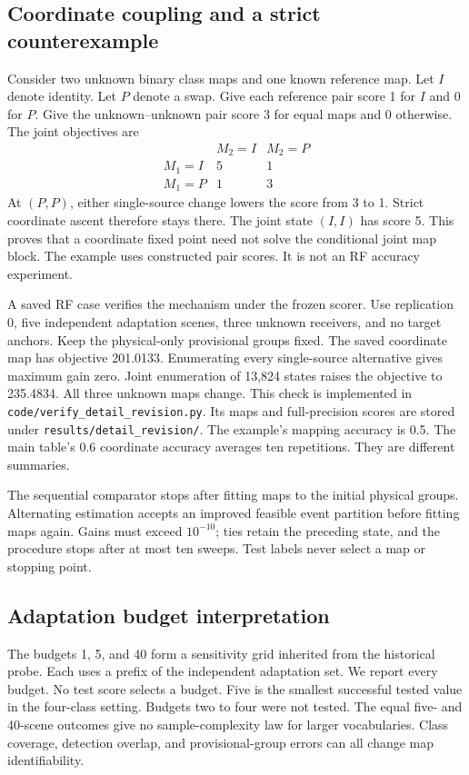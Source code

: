 \documentclass[10pt,a4paper]{article}
\begin{document}
\subsection{Coordinate coupling and a strict counterexample}
Consider two unknown binary class maps and one known reference map. Let $I$ denote identity. Let $P$ denote a swap. Give each reference pair score 1 for $I$ and 0 for $P$. Give the unknown--unknown pair score 3 for equal maps and 0 otherwise. The joint objectives are
\[
\begin{array}{c|cc}
 & M_2=I & M_2=P\\\hline
 M_1=I & 5 & 1\\
 M_1=P & 1 & 3
\end{array}
\]
At $(P,P)$, either single-source change lowers the score from 3 to 1. Strict coordinate ascent therefore stays there. The joint state $(I,I)$ has score 5. This proves that a coordinate fixed point need not solve the conditional joint map block. The example uses constructed pair scores. It is not an RF accuracy experiment.

A saved RF case verifies the mechanism under the frozen scorer. Use replication 0, five independent adaptation scenes, three unknown receivers, and no target anchors. Keep the physical-only provisional groups fixed. The saved coordinate map has objective 201.0133. Enumerating every single-source alternative gives maximum gain zero. Joint enumeration of 13,824 states raises the objective to 235.4834. All three unknown maps change. This check is implemented in \texttt{code/verify\_detail\_revision.py}. Its maps and full-precision scores are stored under \texttt{results/detail\_revision/}. The example's mapping accuracy is 0.5. The main table's 0.6 coordinate accuracy averages ten repetitions. They are different summaries.

The sequential comparator stops after fitting maps to the initial physical groups. Alternating estimation accepts an improved feasible event partition before fitting maps again. Gains must exceed $10^{-10}$; ties retain the preceding state, and the procedure stops after at most ten sweeps. Test labels never select a map or stopping point.

\subsection{Adaptation budget interpretation}
The budgets 1, 5, and 40 form a sensitivity grid inherited from the historical probe. Each uses a prefix of the independent adaptation set. We report every budget. No test score selects a budget. Five is the smallest successful tested value in the four-class setting. Budgets two to four were not tested. The equal five- and 40-scene outcomes give no sample-complexity law for larger vocabularies. Class coverage, detection overlap, and provisional-group errors can all change map identifiability.
\end{document}
